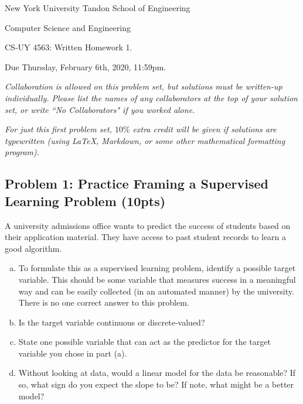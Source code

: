 \documentclass[10pt]{article}
\begin{document}
	
\begin{center}
	\normalsize
	New York University Tandon School of Engineering
	
	Computer Science and Engineering
	\medskip
	
	\large
	CS-UY 4563: Written Homework 1. 
	
	Due Thursday, February 6th, 2020, 11:59pm.
	\medskip
	
	\normalsize 
	\noindent \emph{Collaboration is allowed on this problem set, but solutions must be written-up individually. Please list the names of any collaborators at the top of your solution set, or write ``No Collaborators" if you worked alone.}
	\medskip
	
	\noindent \emph{For just this first problem set, $10\%$ extra credit will be given if solutions are typewritten (using LaTeX, Markdown, or some other mathematical formatting program).}

\end{center} 

\subsection{Problem 1: Practice Framing a Supervised Learning Problem (10pts)}
 A university admissions office wants to predict the success of students based on
their application material.  They have access to past student records to learn
a good algorithm.
\begin{enumerate}[(a)]
	\item To formulate this as a supervised learning problem,
	identify a possible target variable.  This should be some variable that measures success
	in a meaningful way and can be easily collected (in an automated manner) by the
	university. There is no one correct answer to this problem.
	\item Is the target variable continuous or discrete-valued?
	\item State one possible variable that can act as the predictor for the target
	variable you chose in part (a).
	\item Without looking at data, would a linear model for the data be reasonable?
	If so, what sign do you expect the slope to be? If note, what might be a better model?
\end{enumerate}
\end{document}
